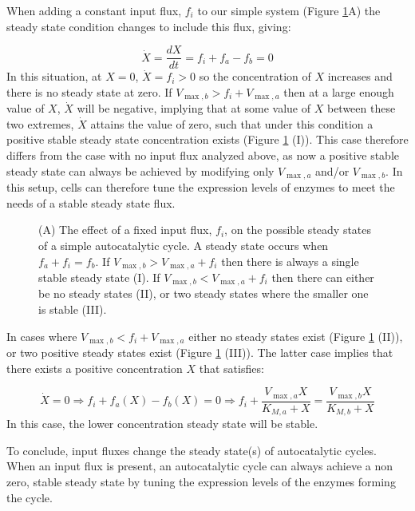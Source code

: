     When adding a constant input flux, $f_i$ to our simple system (Figure \ref{fig:inputcycle}A) the steady state condition changes to include this flux, giving:

    \begin{equation*}
      \dot X = \frac{dX}{dt} = f_i + f_a - f_b = 0
    \end{equation*}
    In this situation, at $X=0$, $\dot X=f_i>0$ so the concentration of $X$ increases and there is no steady state at zero.
    If $V_{\max,b}>f_i+V_{\max,a}$ then at a large enough value of $X$, $\dot X$ will be negative, implying that at some value of $X$ between these two extremes, $\dot{X}$ attains the value of zero, such that under this condition a positive stable steady state concentration exists (Figure \ref{fig:inputcycle} (I)).
    This case therefore differs from the case with no input flux analyzed above, as now a positive stable steady state can always be achieved by modifying only $V_{\max,a}$ and/or $V_{\max,b}$.
    In this setup, cells can therefore tune the expression levels of enzymes to meet the needs of a stable steady state flux.


    \begin{figure}[!htb]
        \centering{
            }
      \caption{\label{fig:inputcycle}
        (A) The effect of a fixed input flux, $f_i$, on the possible steady states of a simple autocatalytic cycle.
        A steady state occurs when $f_a+f_i=f_b$.
        If $V_{\max,b}>V_{\max,a}+f_i$ then there is always a single stable steady state (I).
        If $V_{\max,b}<V_{\max,a}+f_i$ then there can either be no steady states (II), or two steady states where the smaller one is stable (III).
      }
    \end{figure}

    In cases where $V_{\max,b}<f_i+V_{\max,a}$ either no steady states exist (Figure \ref{fig:inputcycle} (II)), or two positive steady states exist (Figure \ref{fig:inputcycle} (III)).
    The latter case implies that there exists a positive concentration $X$ that satisfies:

    \begin{equation*}
        \dot X = 0 \Rightarrow f_i + f_a(X) - f_b(X) = 0 \Rightarrow f_i+\frac{V_{\max,a}X}{K_{M,a}+X} = \frac{V_{\max,b}X}{K_{M,b}+X}
    \end{equation*}
  In this case, the lower concentration steady state will be stable.

  To conclude, input fluxes change the steady state(s) of autocatalytic cycles.
  When an input flux is present, an autocatalytic cycle can always achieve a non zero, stable steady state by tuning the expression levels of the enzymes forming the cycle.

